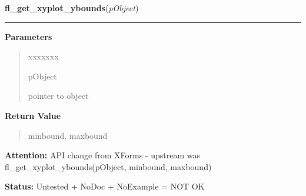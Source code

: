 \hspace{.8\funcindent}\begin{boxedminipage}{\funcwidth}

    \raggedright \textbf{fl\_get\_xyplot\_ybounds}(\textit{pObject})

    \vspace{-1.5ex}

    \rule{\textwidth}{0.5\fboxrule}
\setlength{\parskip}{2ex}
\setlength{\parskip}{1ex}
      \textbf{Parameters}
      \vspace{-1ex}

      \begin{quote}
        \begin{Ventry}{xxxxxxx}

          \item[pObject]

          pointer to object

        \end{Ventry}

      \end{quote}

      \textbf{Return Value}
    \vspace{-1ex}

      \begin{quote}
      minbound, maxbound

      \end{quote}

\textbf{Attention:} API change from XForms - upstream was fl\_get\_xyplot\_ybounds(pObject, 
minbound, maxbound)



\textbf{Status:} Untested + NoDoc + NoExample = NOT OK



    \end{boxedminipage}

    \label{xformslib:library:fl_get_xyplot}

    \vspace{0.5ex}

